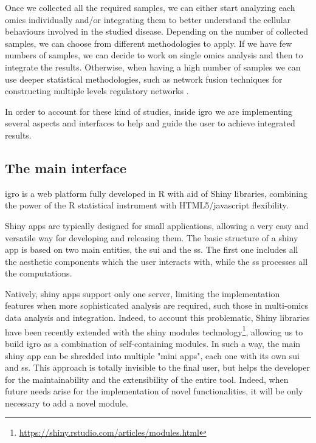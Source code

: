 Once we collected all the required samples, we can either start analyzing each omics individually and/or integrating them to better understand the cellular behaviours involved in the studied disease.
Depending on the number of collected samples, we can choose from different methodologies to apply.
If we have few numbers of samples, we can decide to work on single omics analysis and then to integrate the results.
Otherwise, when having a high number of samples we can use deeper statistical methodologies, such as network fusion techniques for constructing multiple levels regulatory networks \cite{Angelini2014c, Rohart2017, Argelaguet2018}.

In order to account for these kind of studies, inside \gls{igro} we are implementing several aspects and interfaces to help and guide the user to achieve integrated results.

\subsection{The main interface}
\gls{igro} is a web platform fully developed in R with aid of Shiny libraries, combining the power of the R statistical instrument with HTML5/javascript flexibility.

Shiny apps are typically designed for small applications, allowing a very easy and versatile way for developing and releasing them.
The basic structure of a shiny app is based on two main entities, the \gls{sui} and the \gls{ss}.
The first one includes all the aesthetic components which the user interacts with, while the \gls{ss} processes all the computations.

Natively, shiny apps support only one server, limiting the implementation features when more sophisticated analysis are required, such those in multi-omics data analysis and integration.
Indeed, to account this problematic, Shiny libraries have been recently extended with the shiny modules technology\footnote{\url{https://shiny.rstudio.com/articles/modules.html}}, allowing us to build \gls{igro} as a combination of self-containing modules.
In such a way, the main shiny app can be shredded into multiple "mini apps", each one with its own \gls{sui} and \gls{ss}.
This approach is totally invisible to the final user, but helps the developer for the maintainability and the extensibility of the entire tool.
Indeed, when future needs arise for the implementation of novel functionalities, it will be only necessary to add a novel module.


